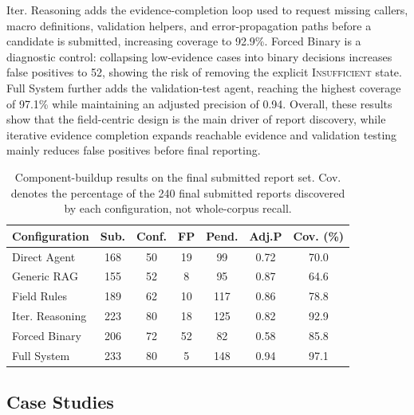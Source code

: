 Iter. Reasoning adds the evidence-completion loop used to request missing
callers, macro definitions, validation helpers, and error-propagation paths
before a candidate is submitted, increasing coverage to 92.9\%. Forced Binary
is a diagnostic control: collapsing low-evidence cases into binary decisions
increases false positives to 52, showing the risk of removing the explicit
\textsc{Insufficient} state. Full System further adds the validation-test
agent, reaching the highest coverage of 97.1\% while maintaining an adjusted
precision of 0.94. Overall, these results show that the field-centric design
is the main driver of report discovery, while iterative evidence completion 
expands reachable evidence and validation testing mainly reduces false 
positives before final reporting. 


\begin{table}[t]
\centering
\caption{Component-buildup results on the final submitted report set. Cov. denotes
the percentage of the 240 final submitted reports discovered by each configuration,
not whole-corpus recall.}
\label{tab:ablation}
\small
\setlength{\tabcolsep}{4pt}
\begin{tabular}{lcccccc}
\toprule
\textbf{Configuration}
& \textbf{Sub.}
& \textbf{Conf.}
& \textbf{FP}
& \textbf{Pend.}
& \textbf{Adj.P}
& \textbf{Cov. (\%)} \\
\midrule
Direct Agent
& 168 & 50 & 19 & 99 & 0.72 & 70.0 \\

Generic RAG
& 155 & 52 & 8 & 95 & 0.87 & 64.6 \\

Field Rules
& 189 & 62 & 10 & 117 & 0.86 & 78.8 \\

Iter. Reasoning
& 223 & 80 & 18 & 125 & 0.82 & 92.9 \\

Forced Binary
& 206 & 72 & 52 & 82 & 0.58 & 85.8 \\

Full System
& 233 & 80 & 5 & 148 & 0.94 & 97.1 \\
\bottomrule
\end{tabular}
\end{table}

\subsection{Case Studies}


